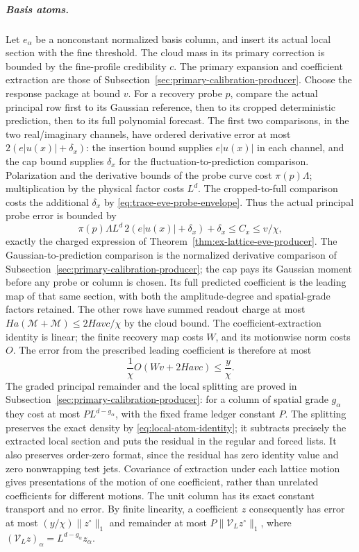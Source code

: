 \subparagraph{Basis atoms.}
Let $e_\alpha$ be a nonconstant normalized basis column, and insert its
actual local section with the fine threshold. The cloud mass in its
primary correction is bounded by the fine-profile credibility $c$. The primary expansion and coefficient extraction
are those of Subsection~\ref{sec:primary-calibration-producer}.
Choose the response package at bound $v$. For a recovery probe $p$,
compare the actual principal row first to its Gaussian reference, then
to its cropped deterministic prediction, then to its full polynomial
forecast. The first two comparisons, in the two real/imaginary channels,
have ordered derivative error at most $2(e|u(x)|+\delta_x)$:
the insertion bound supplies $e|u(x)|$ in each channel, and the cap
bound supplies $\delta_x$ for the fluctuation-to-prediction comparison.
Polarization and the derivative bounds of the probe curve cost
$\pi(p)\Lambda$; multiplication by the physical factor costs $L^d$.
The cropped-to-full comparison costs the additional $\delta_x$ by
\eqref{eq:trace-eve-probe-envelope}. Thus the actual principal probe
error is bounded by
\[
 \pi(p)\Lambda L^d\,2(e|u(x)|+\delta_x)+\delta_x
       \le C_x\le v/\chi,
\]
exactly the charged expression of
Theorem~\ref{thm:ex-lattice-eve-producer}. The Gaussian-to-prediction
comparison is the normalized derivative comparison of
Subsection~\ref{sec:primary-calibration-producer}; the cap pays its
Gaussian moment before any probe or column is chosen. Its full predicted coefficient is the leading map of that
same section, with both the amplitude-degree and spatial-grade factors
retained. The other rows have summed readout charge at most
$Ha(\mathcal M+\mathcal M)\le2Havc/\chi$ by the cloud bound.
The coefficient-extraction identity is linear; the finite recovery
map costs $W$, and its motionwise norm costs $O$. The error from the
prescribed leading coefficient is therefore at most
\[
 \frac1\chi O(Wv+2Havc)\le \frac y\chi.
\]
The graded principal remainder and the local splitting are proved in
Subsection~\ref{sec:primary-calibration-producer}: for a column of spatial
grade $g_\alpha$ they cost at most $P L^{d-g_\alpha}$, with the fixed
frame ledger constant $P$. The splitting preserves the exact density
by \eqref{eq:local-atom-identity}; it subtracts precisely the extracted
local section and puts the residual in the regular and forced lists.
It also preserves order-zero format, since the residual has zero
identity value and zero nonwrapping test jets. Covariance of extraction
under each lattice motion gives presentations of the motion of one
coefficient, rather than unrelated coefficients for different motions.
The unit column has its exact constant transport and no error.
By finite linearity, a coefficient $z$ consequently has error at most
$(y/\chi)\|z^\circ\|_1$ and remainder at most
$P\|\mathcal V_Lz^\circ\|_1$, where
$(\mathcal V_Lz)_\alpha=L^{d-g_\alpha}z_\alpha$.

